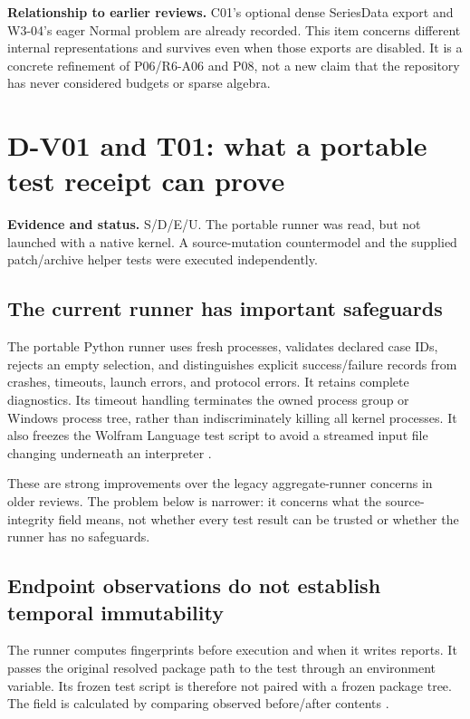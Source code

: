 \documentclass[11pt,a4paper]{article}
\newcommand{\code}[1]{\texttt{\detokenize{#1}}}
\newcommand{\evidence}[1]{\par\noindent\textbf{Evidence and status.} #1\par}
\newcommand{\novelty}[1]{\par\noindent\textbf{Relationship to earlier reviews.} #1\par}
\theoremstyle{remark}
\begin{document}
\novelty{C01's optional dense SeriesData export and W3-04's eager Normal problem are already recorded. This item concerns different internal representations and survives even when those exports are disabled. It is a concrete refinement of P06/R6-A06 and P08, not a new claim that the repository has never considered budgets or sparse algebra.}

\section{D-V01 and T01: what a portable test receipt can prove}\label{sec:receipt}
\evidence{S/D/E/U. The portable runner was read, but not launched with a native kernel. A source-mutation countermodel and the supplied patch/archive helper tests were executed independently.}

\subsection{The current runner has important safeguards}

The portable Python runner uses fresh processes, validates declared case IDs, rejects an empty selection, and distinguishes explicit success/failure records from crashes, timeouts, launch errors, and protocol errors. It retains complete diagnostics. Its timeout handling terminates the owned process group or Windows process tree, rather than indiscriminately killing all kernel processes. It also freezes the Wolfram Language test script to avoid a streamed input file changing underneath an interpreter \cite{runner}.

These are strong improvements over the legacy aggregate-runner concerns in older reviews. The problem below is narrower: it concerns what the source-integrity field means, not whether every test result can be trusted or whether the runner has no safeguards.

\subsection{Endpoint observations do not establish temporal immutability}

The runner computes fingerprints before execution and when it writes reports. It passes the original resolved package path to the test through an environment variable. Its frozen test script is therefore not paired with a frozen package tree. The field \code{SourcesUnchangedDuringRun} is calculated by comparing observed before/after contents \cite{runner}.
\end{document}
